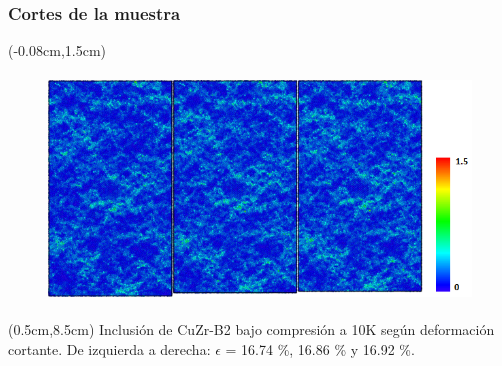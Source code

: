 \begin{frame}
  \frametitle{Cortes de la muestra}
  \begin{textblock*}{12.6cm}(-0.08cm,1.5cm) 
    \begin{figure}[htp]
     \centering
     \includegraphics[height=6cm]{../ResumenImagenes/Figures/NanoParticles/Snapshots/B2SphereCompression_10K_Snapshots.png}
    \end{figure}
  \end{textblock*}
  \begin{textblock*}{12cm}(0.5cm,8.5cm) 
    \centering
      \small{Inclusión de CuZr-B2 bajo compresión a 10K según deformación cortante. De izquierda a derecha: $\epsilon$ = 16.74 \%, 16.86 \% y 16.92 \%.}
    \end{textblock*}
\end{frame}

